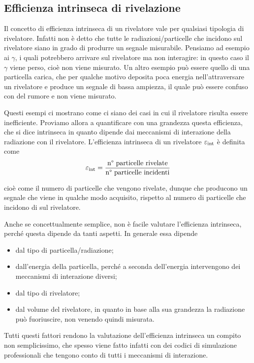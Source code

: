 \subsection{Efficienza intrinseca di rivelazione}
Il concetto di efficienza intrinseca di un rivelatore vale per qualsiasi tipologia di rivelatore. Infatti non è detto che tutte le radiazioni/particelle che incidono sul rivelatore siano in grado di produrre un segnale misurabile. Pensiamo ad esempio ai $\gamma$, i quali potrebbero arrivare sul rivelatore ma non interagire: in questo caso il $\gamma$ viene perso, cioè non viene misurato. Un altro esempio può essere quello di una particella carica, che per qualche motivo deposita poca energia nell'attraversare un rivelatore e produce un segnale di bassa ampiezza, il quale può essere confuso con del rumore e non viene misurato.

Questi esempi ci mostrano come ci siano dei casi in cui il rivelatore risulta essere inefficiente. Proviamo allora a quantificare con una grandezza questa efficienza, che si dice intrinseca in quanto dipende dai meccanismi di interazione della radiazione con il rivelatore. L'efficienza intrinseca di un rivelatore $\varepsilon_{\rm int}$ è definita come
\begin{equation*}
   \varepsilon_{\rm int}
   =\frac{\text{n° particelle rivelate}}{\text{n° particelle incidenti}}
\end{equation*}

cioè come il numero di particelle che vengono rivelate, dunque che producono un segnale che viene in qualche modo acquisito, rispetto al numero di particelle che incidono di sul rivelatore.

Anche se concettualmente semplice, non è facile valutare l'efficienza intrinseca, perché questa dipende da tanti aspetti. In generale essa dipende
\begin{itemize}
   \item dal tipo di particella/radiazione;%
   \item dall'energia della particella, perché a seconda dell'energia intervengono dei meccanismi di interazione diversi;
   \item dal tipo di rivelatore;
   \item dal volume del rivelatore, in quanto in base alla sua grandezza la radiazione può fuoriuscire, non venendo quindi misurata.
\end{itemize}
  Tutti questi fattori rendono la valutazione dell'efficienza intrinseca un compito non semplicissimo, che spesso viene fatto infatti con dei codici di simulazione professionali che tengono conto di tutti i meccanismi di interazione.
